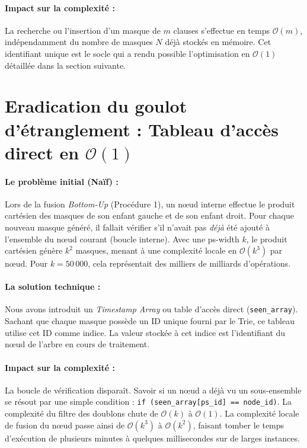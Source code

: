 \documentclass[11pt,a4paper]{report}
\begin{document}
\paragraph{Impact sur la complexité :}
La recherche ou l'insertion d'un masque de $m$ clauses s'effectue en temps $\mathcal{O}(m)$, indépendamment du nombre de masques $N$ déjà stockés en mémoire. Cet identifiant unique est le socle qui a rendu possible l'optimisation en $\mathcal{O}(1)$ détaillée dans la section suivante.

\section*{Eradication du goulot d'étranglement : Tableau d'accès direct en $\mathcal{O}(1)$}

\paragraph{Le problème initial (Naïf) :}
Lors de la fusion \textit{Bottom-Up} (Procédure 1), un nœud interne effectue le produit cartésien des masques de son enfant gauche et de son enfant droit. Pour chaque nouveau masque généré, il fallait vérifier s'il n'avait pas \textit{déjà} été ajouté à l'ensemble du nœud courant (boucle interne). Avec une ps-width $k$, le produit cartésien génère $k^2$ masques, menant à une complexité locale en $\mathcal{O}(k^3)$ par nœud. Pour $k = 50\,000$, cela représentait des milliers de milliards d'opérations.

\paragraph{La solution technique :}
Nous avons introduit un \textit{Timestamp Array} ou table d'accès direct (\texttt{seen\_array}). Sachant que chaque masque possède un ID unique fourni par le Trie, ce tableau utilise cet ID comme indice. La valeur stockée à cet indice est l'identifiant du nœud de l'arbre en cours de traitement. 

\paragraph{Impact sur la complexité :}
La boucle de vérification disparaît. Savoir si un nœud a déjà vu un sous-ensemble se résout par une simple condition : \texttt{if (seen\_array[ps\_id] == node\_id)}. La complexité du filtre des doublons chute de $\mathcal{O}(k)$ à $\mathcal{O}(1)$. La complexité locale de fusion du nœud passe ainsi de $\mathcal{O}(k^3)$ à $\mathcal{O}(k^2)$, faisant tomber le temps d'exécution de plusieurs minutes à quelques millisecondes sur de larges instances.
\end{document}
